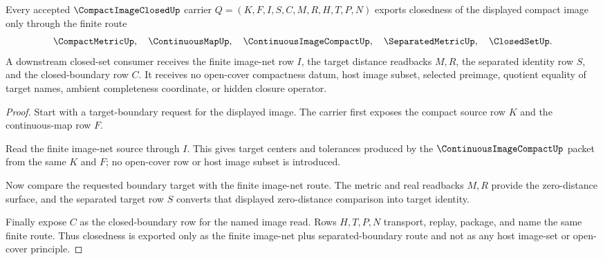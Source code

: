\begin{theorem}
\label{thm:compact-image-closed-closed-target-route}
Every accepted $\CompactImageClosedUp$ carrier $Q=(K,F,I,S,C,M,R,H,T,P,N)$ exports closedness of the displayed compact image only through the finite route
$$
\CompactMetricUp,\quad
\ContinuousMapUp,\quad
\ContinuousImageCompactUp,\quad
\SeparatedMetricUp,\quad
\ClosedSetUp .
$$
A downstream closed-set consumer receives the finite image-net row $I$, the target distance readbacks $M,R$, the separated identity row $S$, and the closed-boundary row $C$. It receives no open-cover compactness datum, host image subset, selected preimage, quotient equality of target names, ambient completeness coordinate, or hidden closure operator.
\end{theorem}
\begin{proof}
Start with a target-boundary request for the displayed image. The carrier first exposes the compact source row $K$ and the continuous-map row $F$.

Read the finite image-net source through $I$. This gives target centers and tolerances produced by the $\ContinuousImageCompactUp$ packet from the same $K$ and $F$; no open-cover row or host image subset is introduced.

Now compare the requested boundary target with the finite image-net route. The metric and real readbacks $M,R$ provide the zero-distance surface, and the separated target row $S$ converts that displayed zero-distance comparison into target identity.

Finally expose $C$ as the closed-boundary row for the named image read. Rows $H,T,P,N$ transport, replay, package, and name the same finite route. Thus closedness is exported only as the finite image-net plus separated-boundary route and not as any host image-set or open-cover principle.
\end{proof}


